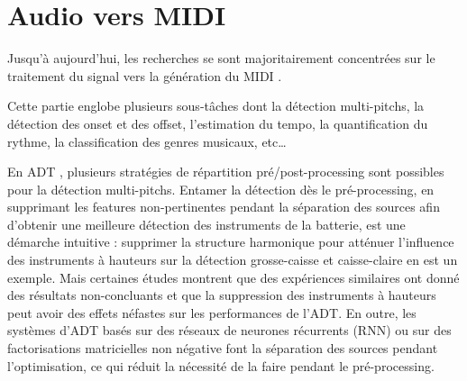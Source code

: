 \section{Audio vers MIDI}
Jusqu’à aujourd’hui, les recherches se sont majoritairement concentrées sur le
traitement du signal  vers la génération du MIDI
\cite{AMT_for_2_Instru}. 

Cette partie englobe plusieurs sous-tâches dont la détection multi-pitchs, 
la détection des onset et des offset, 
l'estimation du tempo, la quantification du rythme, la classification des
genres musicaux, etc… 


En ADT \cite{Review_ADT}, plusieurs stratégies de répartition
pré/post-processing sont possibles pour la détection multi-pitchs. Entamer la
détection dès le pré-processing, en supprimant les features non-pertinentes
pendant la séparation des sources afin d’obtenir une meilleure détection des
instruments de la batterie, est une démarche intuitive : supprimer la structure
harmonique pour atténuer l’influence des instruments à hauteurs  sur la détection grosse-caisse et caisse-claire en est un
exemple. 
Mais certaines études montrent que des expériences similaires ont donné des
résultats non-concluants et que la suppression des instruments à hauteurs peut
avoir des effets néfastes sur les performances de l’ADT. En outre, les systèmes
d’ADT basés sur des réseaux de neurones récurrents (RNN) ou sur des
factorisations matricielles non négative font la séparation des sources pendant
l’optimisation, ce qui réduit la nécessité de la faire pendant le
pré-processing.

